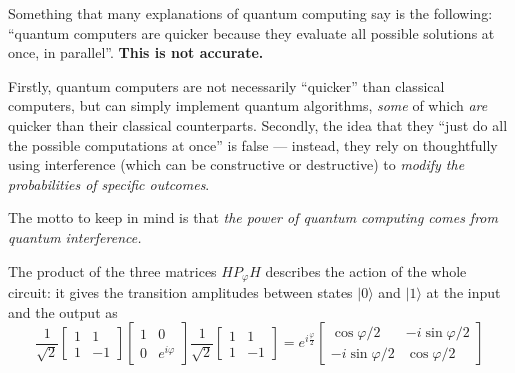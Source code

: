\documentclass[fleqn]{article}
\newenvironment{idea}{\noindent}{\medskip}
\begin{document}
\begin{idea}
Something that many explanations of quantum computing say is the following: ``quantum computers are quicker because they evaluate all possible solutions at once, in parallel''.
\textbf{This is not accurate.}

Firstly, quantum computers are not necessarily ``quicker'' than classical computers, but can simply implement quantum algorithms, \emph{some} of which \emph{are} quicker than their classical counterparts.
Secondly, the idea that they ``just do all the possible computations at once'' is false --- instead, they rely on thoughtfully using interference (which can be constructive or destructive) to \emph{modify the probabilities of specific outcomes}.

The motto to keep in mind is that \emph{the power of quantum computing comes from quantum interference.}

\end{idea}

The product of the three matrices \(HP_\varphi H\) describes the action of the whole circuit: it gives the transition amplitudes between states \(|0\rangle\) and \(|1\rangle\) at the input and the output as
\[
  \frac{1}{\sqrt{2}}
  \begin{bmatrix}
    1 & 1
  \\1 & -1
  \end{bmatrix}
  \begin{bmatrix}
    1 & 0
  \\0 & e^{i\varphi}
  \end{bmatrix}
  \frac{1}{\sqrt{2}}
  \begin{bmatrix}
    1 & 1
  \\1 & -1
  \end{bmatrix}
  = e^{i\frac{\varphi}{2}}
  \begin{bmatrix}
    \cos\varphi/2 & -i\sin\varphi/2
  \\-i\sin\varphi/2 & \cos\varphi/2
  \end{bmatrix}
\]
\end{document}
